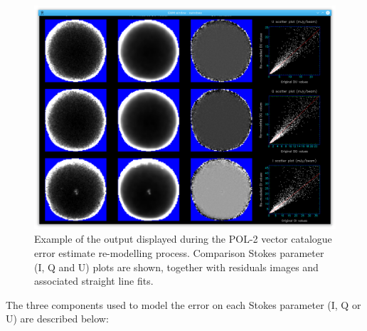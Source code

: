 \begin{figure}[ht!]
\begin{center}
\includegraphics[width=0.46\linewidth]{sc22-ophl1688-pol2noise-fitting-1.png}
\caption [Plotting Window produced During POL-2 Vector Catalogue Error Estimate Remodelling for Oph L1688]{Example of the output displayed during the POL-2
vector catalogue error estimate re-modelling process. Comparison Stokes parameter
(I, Q and U) plots are shown, together with residuals images and associated straight line fits.
}
\label{fig:remodellingwindow}
\end{center}
\end{figure}

The three components used to model the error on each Stokes parameter (I, Q or U) are described below:

